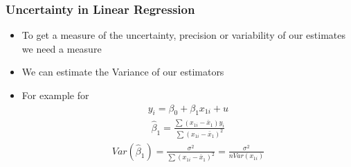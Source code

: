 \documentclass[
  shownotes,
  xcolor={svgnames},
  hyperref={colorlinks,citecolor=DarkBlue,linkcolor=andesred,urlcolor=DarkBlue}
  , aspectratio=169]{beamer}
\begin{document}
\begin{frame}
\frametitle{ Uncertainty in Linear Regression}

\begin{itemize}
  \item To get a measure of the uncertainty, precision or variability of our estimates we need a measure
  \medskip
  \item We can estimate the Variance of our estimators
  \medskip
  \item For example for
  \begin{align}
  y_{i}=\beta_{0}+\beta_{1}x_{1i}+u
  \end{align}
  \begin{align}
  \hat{\beta}_{1} = \frac{\sum(x_{1i}-\bar{x}_{1})y_{i}}{\sum(x_{1i}-\bar{x}_{1})^{2}}
  \end{align}
  \begin{align}
  Var(\hat{\beta}_{1}) = \frac{\sigma^2}{\sum(x_{1i}-\bar{x}_{1})^{2}}=\frac{\sigma^2}{nVar(x_{1i})}
  \end{align}
\end{itemize}

\end{frame}
\end{document}
